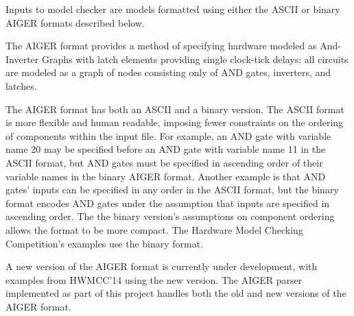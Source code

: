 \documentclass[12pt,a4paper,twoside,openright]{report}
\begin{document}
Inputs to model checker are models formatted using either the ASCII or
binary AIGER formats described below.

The AIGER format provides a method of specifying hardware modeled as
And-Inverter Graphs with latch elements providing single clock-tick
delays: all circuits are modeled as a graph of nodes consisting only of
AND gates, inverters, and latches.

The AIGER format has both an ASCII and a binary version. The ASCII
format is more flexible and human readable, imposing fewer constraints
on the ordering of components within the input file. For example, an
AND gate with variable name 20 may be specified before an AND gate with
variable name 11 in the ASCII format, but AND gates must be specified in
ascending order of their variable names in the binary AIGER format. Another
example is that AND gates' inputs can be specified in any order in the ASCII
format, but the binary format encodes AND gates under the assumption
that inputs are specified in ascending order.
The the binary version's assumptions on component ordering allows the format
to be more compact. The Hardware Model Checking Competition's examples
use the binary format.

A new version of the AIGER format is currently under development, with
examples from HWMCC'14 using the new version. The AIGER parser implemented
as part of this project handles both the old and new versions of the AIGER
format.
\end{document}
